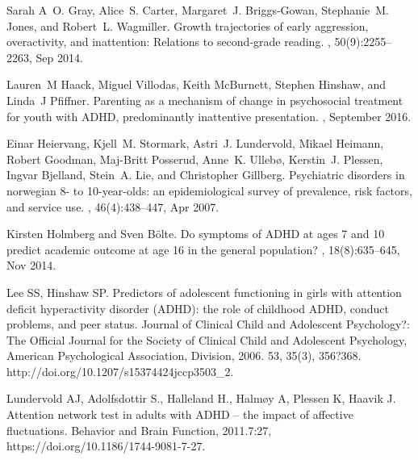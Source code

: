 \documentclass[10pt,letterpaper]{article}
\begin{document}
\begin{thebibliography}{10}
Sarah A~O. Gray, Alice~S. Carter, Margaret~J. Briggs-Gowan, Stephanie~M. Jones,
  and Robert~L. Wagmiller.
\newblock Growth trajectories of early aggression, overactivity, and
  inattention: Relations to second-grade reading.
, 50(9):2255--2263, Sep 2014.

Lauren~M Haack, Miguel Villodas, Keith McBurnett, Stephen Hinshaw, and Linda~J
  Pfiffner.
\newblock Parenting as a mechanism of change in psychosocial treatment for
  youth with {ADHD}, predominantly inattentive presentation.
, September 2016.


Einar Heiervang, Kjell~M. Stormark, Astri~J. Lundervold, Mikael Heimann, Robert
  Goodman, Maj-Britt Posserud, Anne~K. Ulleb\o{}, Kerstin~J. Plessen, Ingvar
  Bjelland, Stein~A. Lie, and Christopher Gillberg.
\newblock Psychiatric disorders in norwegian 8- to 10-year-olds: an
  epidemiological survey of prevalence, risk factors, and service use.
, 46(4):438--447, Apr 2007.

Kirsten Holmberg and Sven {B\"{o}lte}.
\newblock Do symptoms of {ADHD} at ages 7 and 10 predict academic outcome at
  age 16 in the general population?
, 18(8):635--645, Nov 2014.

Lee SS, Hinshaw SP.
\newblock Predictors of adolescent functioning in girls with attention deficit
  hyperactivity disorder ({ADHD}): the role of childhood {ADHD}, conduct
  problems, and peer status.
\newblock Journal of Clinical Child and Adolescent Psychology?: The Official Journal for the Society of Clinical Child and Adolescent Psychology, 
\newblock American Psychological Association, Division, 2006. 53, 35(3), 356?368. http://doi.org/10.1207/s15374424jccp3503\_2.

Lundervold AJ, Adolfsdottir S., Halleland H., Halm\o{}y A, 
  Plessen K, Haavik J.
\newblock Attention network test in adults with ADHD -- the impact of affective
  fluctuations.
\newblock Behavior and Brain Function, 2011.7:27, https://doi.org/10.1186/1744-9081-7-27.


\end{thebibliography}
\end{document}
